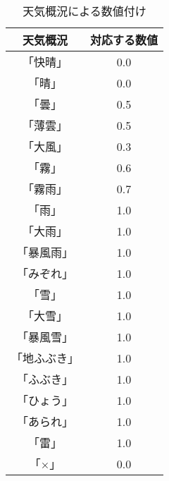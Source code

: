 \begin{table*}[t]
\centering
  \caption{天気概況による数値付け}
  \begin{tabular}{|c|c|} \hline
    天気概況 & 対応する数値 \\ \hline
    「快晴」 & 0.0 \\ \hline
    「晴」 & 0.0 \\ \hline
    「曇」 & 0.5 \\ \hline
    「薄雲」 & 0.5 \\ \hline
    「大風」 & 0.3 \\ \hline
    「霧」 & 0.6 \\ \hline
    「霧雨」 & 0.7 \\ \hline
    「雨」 & 1.0 \\ \hline
    「大雨」 & 1.0 \\ \hline
    「暴風雨」 & 1.0 \\ \hline
    「みぞれ」 & 1.0 \\ \hline
    「雪」 & 1.0 \\ \hline
    「大雪」 & 1.0 \\ \hline
    「暴風雪」 & 1.0 \\ \hline
    「地ふぶき」 & 1.0 \\ \hline
    「ふぶき」 & 1.0 \\ \hline
    「ひょう」 & 1.0 \\ \hline
    「あられ」 & 1.0 \\ \hline
    「雷」 & 1.0 \\ \hline
    「×」 & 0.0 \\ \hline
  \end{tabular}
\end{table*}
%

